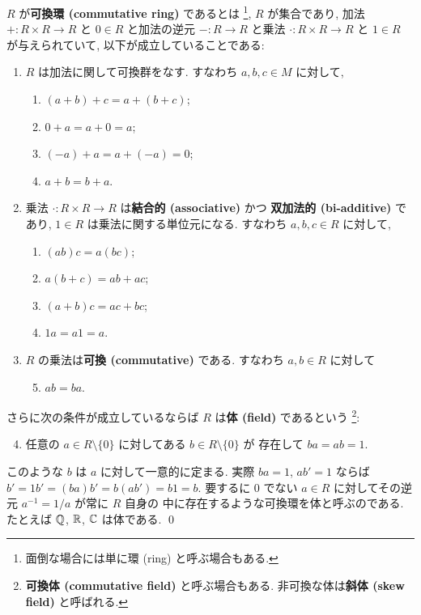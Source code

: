 \documentclass[12pt,twoside]{jarticle}
\begin{document}
\begin{definition}[可換環と体]
  \label{def:ring-field}
  $R$ が{\bf 可換環 (commutative ring)} であるとは%
  \footnote{面倒な場合には単に環 (ring) と呼ぶ場合もある.},
  $R$ が集合であり,
  加法 $+:R\times R\to R$
  と $0\in R$
  と加法の逆元 $-:R\to R$
  と乗法 $\cdot:R\times R\to R$
  と $1\in R$ が与えられていて,
  以下が成立していることである:
  \begin{enumerate}
  \item $R$ は加法に関して可換群をなす. すなわち $a,b,c\in M$ に対して,
    \begin{enumerate}
    \item $(a + b) + c = a + (b + c)$;
    \item $0 + a = a + 0 = a$;
    \item $(-a) + a = a + (-a) = 0$;
    \item $a + b = b + a$.
    \end{enumerate}
  \item 乗法 $\cdot:R\times R\to R$ は{\bf 結合的 (associative)} かつ
    {\bf 双加法的 (bi-additive)} であり, $1\in R$ は乗法に関する単位元になる.
    すなわち $a,b,c\in R$ に対して,
    \begin{enumerate}
    \item $(ab)c = a(bc)$;
    \item $a(b + c) = ab + ac$;
    \item $(a + b)c = ac + bc$;
    \item $1a = a1 = a$.
    \end{enumerate}
  \item $R$ の乗法は{\bf 可換 (commutative)} である. 
    すなわち $a,b\in R$ に対して
    \begin{enumerate}
    \setcounter{enumii}{4}
    \item $ab=ba$.
    \end{enumerate}
  \end{enumerate}
  さらに次の条件が成立しているならば $R$ は{\bf 体 (field)} であるという%
  \footnote{{\bf 可換体 (commutative field)} と呼ぶ場合もある.
    非可換な体は{\bf 斜体 (skew field)} と呼ばれる.}:
  \begin{enumerate}
    \setcounter{enumi}{3}
  \item 任意の $a\in R\setminus\{0\}$ に対してある $b\in R\setminus\{0\}$ が
    存在して $ba = ab = 1$.
  \end{enumerate}
  このような $b$ は $a$ に対して一意的に定まる. 
  実際 $ba=1$, $ab'=1$ ならば $b'=1b'=(ba)b'=b(ab')=b1=b$.
  要するに $0$ でない $a\in R$ に対してその逆元 $a^{-1}=1/a$ が常に $R$ 自身の
  中に存在するような可換環を体と呼ぶのである.
  たとえば ${\mathbb Q}$, ${\mathbb R}$, ${\mathbb C}$ は体である.
  \qed
\end{definition}
\end{document}
